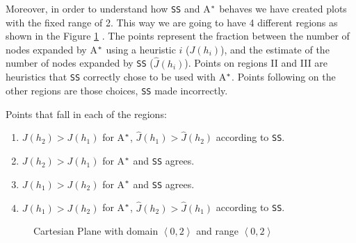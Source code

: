 Moreover, in order to understand how \texttt{SS} and A$\sp{*}$ behaves we have created plots with the fixed range of 2. This way we are going to have 4 different regions as shown in the Figure \ref{fig:img_cartesian_plane} . The points represent the fraction between the  number of nodes expanded by A$\sp{*}$ using a heuristic $i$ ($J(h_{i})$), and the estimate of the number of nodes expanded by \texttt{SS} ($\hat{J}(h_{i})$). Points on regions II and III are heuristics that \texttt{SS} correctly chose to be used with A$\sp{*}$. Points following on the other regions are those choices, \texttt{SS} made incorrectly.

Points that fall in each of the regions:
\begin{enumerate}[label=\Roman*]
\item $J(h_{2}) > J(h_{1})$ for A$\sp{*}$, $\hat{J}(h_{1}) > \hat{J}(h_{2})$ according to \texttt{SS}. 
\item $J(h_{2}) > J(h_{1})$ for A$\sp{*}$ and \texttt{SS} agrees.
\item $J(h_{1}) > J(h_{2})$ for A$\sp{*}$ and \texttt{SS} agrees.
\item $J(h_{1}) > J(h_{2})$ for A$\sp{*}$, $\hat{J}(h_{2}) > \hat{J}(h_{1})$ according to \texttt{SS}.
\end{enumerate}

\pagestyle{empty}

\begin{figure}[!htb]
\centering  
{}
  \caption{Cartesian Plane with domain $\left\langle 0, 2\right\rangle$ and range $\left\langle 0, 2\right\rangle$ }\label{fig:img_cartesian_plane}
\end{figure}

